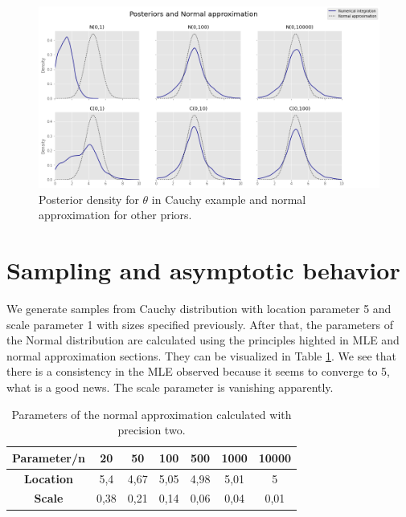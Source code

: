 \documentclass[a4paper,10pt, notitlepage]{report}
\theoremstyle{plain}
\begin{document}
\begin{figure}[H]
    \centering
    \includegraphics[width=.85\textwidth]{../../images/comparison-other-cases.png}
    \caption{Posterior density for $\theta$ in Cauchy example and normal approximation for other priors.}
    \label{fig:comparison-normal-posteriori-other}
\end{figure}

\section*{Sampling and asymptotic behavior}

We generate samples from Cauchy distribution with location parameter 5 and
scale parameter 1 with sizes specified previously. After that, the parameters of
the Normal distribution are calculated using the principles highted in MLE and
normal approximation sections. They can be visualized in Table
\ref{tb:approximation-normal-sizes}. We see that there is a consistency in the
MLE observed because it seems to converge to 5, what is a good news. The scale
parameter is vanishing apparently. 

\begin{table}[ht]
    \centering
    \begin{tabular}{|c|c|c|c|c|c|c|}
    \hline
    \textbf{Parameter/n} & \textbf{20} & \textbf{50} & \textbf{100} & \textbf{500} & \textbf{1000} & \textbf{10000} \\ \hline
    \textbf{Location}    & 5,4         & 4,67        & 5,05         & 4,98         & 5,01          & 5              \\ \hline
    \textbf{Scale}       & 0,38        & 0,21        & 0,14          & 0,06         & 0,04        & 0,01          \\ \hline
    \end{tabular}
    \caption{Parameters of the normal approximation calculated with precision two.}
    \label{tb:approximation-normal-sizes}
\end{table}
\end{document}
